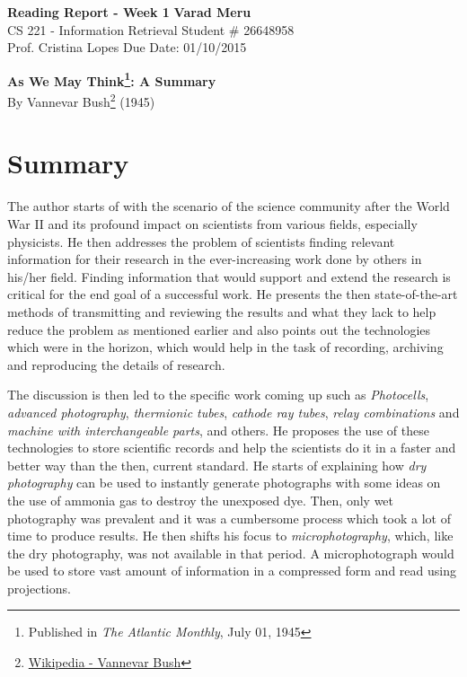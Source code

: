 \documentclass[a4paper, 11pt]{article}
\begin{document}
\begin{noindent}
\large\textbf{Reading Report - Week 1} \hfill \textbf{Varad Meru} \\
\normalsize CS 221 - Information Retrieval \hfill Student \# 26648958 \\
Prof. Cristina Lopes \hfill Due Date: 01/10/2015
\end{noindent}
\noindent\makebox[\linewidth]{\rule{\textwidth}{0.4pt}}
\begin{center}
\textbf{\Large{{As We May Think}\footnote{Published in \textit{The Atlantic Monthly}, July 01, 1945}}: A Summary}\\
By {Vannevar Bush}\footnote{\href{http://en.wikipedia.org/wiki/Vannevar_Bush}{Wikipedia - Vannevar Bush}} (1945)
\end{center}
\vspace{-25pt}
\section*{Summary}
\vspace{-5pt}
The author starts of with the scenario of the science community after the World War II and its profound impact on scientists from various fields, especially physicists. He then addresses the problem of scientists finding relevant information for their research in the ever-increasing work done by others in his/her field. Finding information that would support and extend the research is critical for the end goal of a successful work. He presents the then state-of-the-art methods of transmitting and reviewing the results and what they lack to help reduce the problem as mentioned earlier and also points out the technologies which were in the horizon, which would help in the task of recording, archiving and reproducing the details of research.

The discussion is then led to the specific work coming up such as \textit{Photocells}, \textit{advanced photography}, \textit{thermionic tubes}, \textit{cathode ray tubes}, \textit{relay combinations} and \textit{machine with interchangeable parts}, and others. He proposes the use of these technologies to store scientific records and help the scientists do it in a faster and better way than the then, current standard. He starts of explaining how \textit{dry photography} can be used to instantly generate photographs with some ideas on the use of ammonia gas to destroy the unexposed dye. Then, only wet photography was prevalent and it was a cumbersome process which took a lot of time to produce results. He then shifts his focus to \textit{microphotography}, which, like the dry photography, was not available in that period. A microphotograph would be used to store vast amount of information in a compressed form and read using projections.
\end{document}
